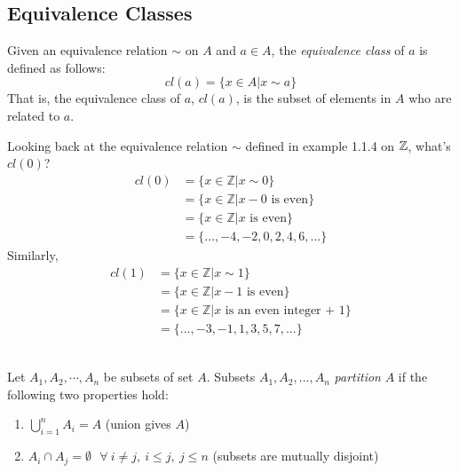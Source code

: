 \subsection{Equivalence Classes}
\begin{definition}
Given an equivalence relation $\sim$  on $A$ and $a\in A$, the \textit{equivalence class} of $a$ is defined as follows:
\begin{equation}
    cl(a)=\{x\in A | x \sim a\} \nonumber
\end{equation}
That is, the equivalence class of $a$, $cl(a)$, is the subset of elements in $A$ who are related to $a$.
\end{definition}
\noindent Looking back at the equivalence relation $\sim$ defined in example 1.1.4 on ${\mathbb{ Z}}$, what's $cl(0)$?\\
\begin{align}
    cl(0)&= \{x\in \mathbb{Z}| x\sim 0\} \nonumber\\
    &= \{x\in \mathbb{Z}| x-0 \text{ is even}\}\nonumber\\
    &= \{x\in \mathbb{Z}| x \text{ is even}\}\nonumber\\
    &= \{...,-4,-2,0,2,4,6, ...\}\nonumber
\end{align}
Similarly,
\begin{align}
    cl(1)&= \{x\in \mathbb{Z}| x\sim 1\} \nonumber\\
    &= \{x\in \mathbb{Z}| x-1 \text{ is even}\}\nonumber\\
    &= \{x\in \mathbb{Z}| x \text{ is an even integer + 1}\}\nonumber\\
    &= \{...,-3,-1,1,3,5,7, ...\}\nonumber
\end{align} \\
\newpage
\begin{definition}[Partition]
Let $A_1, A_2, \cdots , A_n$ be subsets of set $A$. Subsets $A_1, A_2, ..., A_n$ \textit{partition} $A$ if the following two properties hold:
\begin{enumerate}[label=(\roman*)]
    \item $\bigcup_{i=1}^n A_i=A$ \hfill (union gives $A$)
    \item $A_i\cap A_j = \emptyset \ \ \ \forall\  i\neq j, \ i\leq j, \ j\leq n$ \hfill (subsets are mutually disjoint)
\end{enumerate}
\end{definition}
